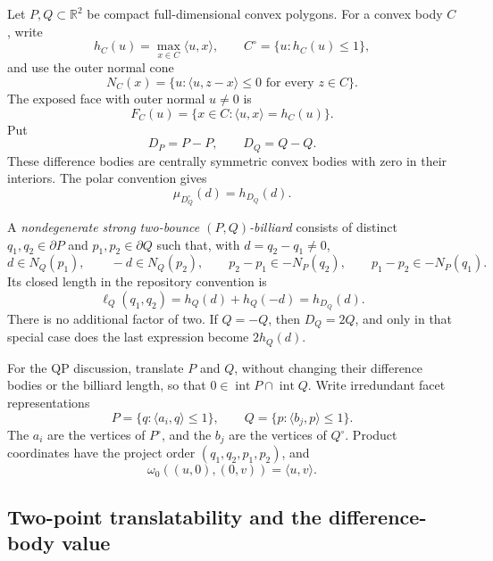 Let \(P,Q\subset\mathbb R^2\) be compact full-dimensional convex polygons.
For a convex body \(C\), write
\[
 h_C(u)=\max_{x\in C}\langle u,x\rangle,
 \qquad
 C^\circ=\{u:h_C(u)\leq1\},
\]
and use the outer normal cone
\[
 N_C(x)=\{u:\langle u,z-x\rangle\leq0
                 \text{ for every }z\in C\}.
\]
The exposed face with outer normal \(u\neq0\) is
\[
 F_C(u)=\{x\in C:\langle u,x\rangle=h_C(u)\}.
\]
Put
\[
 D_P=P-P,\qquad D_Q=Q-Q.
\]
These difference bodies are centrally symmetric convex bodies with zero in
their interiors.  The polar convention gives
\[
 \mu_{D_Q^\circ}(d)=h_{D_Q}(d).
\]

A \emph{nondegenerate strong two-bounce \((P,Q)\)-billiard} consists of
distinct \(q_1,q_2\in\partial P\) and \(p_1,p_2\in\partial Q\) such that,
with \(d=q_2-q_1\neq0\),
\begin{equation}
\label{eq:product-two-bounce-strong-relations}
 d\in N_Q(p_1),\qquad
 -d\in N_Q(p_2),\qquad
 p_2-p_1\in-N_P(q_2),\qquad
 p_1-p_2\in-N_P(q_1).
\end{equation}
Its closed length in the repository convention is
\begin{equation}
\label{eq:product-two-bounce-length}
 \ell_Q(q_1,q_2)
 =h_Q(d)+h_Q(-d)
 =h_{D_Q}(d).
\end{equation}
There is no additional factor of two.  If \(Q=-Q\), then \(D_Q=2Q\), and
only in that special case does the last expression become \(2h_Q(d)\).

For the QP discussion, translate \(P\) and \(Q\), without changing their
difference bodies or the billiard length, so that
\(0\in\operatorname{int}P\cap\operatorname{int}Q\).  Write irredundant facet
representations
\[
 P=\{q:\langle a_i,q\rangle\leq1\},
 \qquad
 Q=\{p:\langle b_j,p\rangle\leq1\}.
\]
The \(a_i\) are the vertices of \(P^\circ\), and the \(b_j\) are the
vertices of \(Q^\circ\).  Product coordinates have the project order
\((q_1,q_2,p_1,p_2)\), and
\[
 \omega_0((u,0),(0,v))=\langle u,v\rangle.
\]

\subsection{Two-point translatability and the difference-body value}
\label{subsec:product-two-bounce-difference-body}


